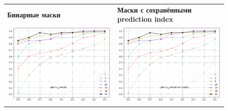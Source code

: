 \documentclass{article}
\begin{document}
    \begin{table}[h!]
        \begin{tabular}{p{0.45\linewidth}p{0.45\linewidth}}
            \textbf{Бинарные маски} & \textbf{Маски с сохранёнными prediction index}\\
            \includegraphics[width=\linewidth]{p} & \includegraphics[width=\linewidth]{p_non_binary}\\ 

\end{tabular}
\end{table}
\end{document}
